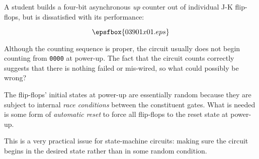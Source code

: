 

A student builds a four-bit asynchronous {\it up} counter out of individual J-K flip-flops, but is dissatisfied with its performance:

$$\epsfbox{03901x01.eps}$$

Although the counting sequence is proper, the circuit usually does not begin counting from {\tt 0000} at power-up.  The fact that the circuit counts correctly suggests that there is nothing failed or mis-wired, so what could possibly be wrong?







The flip-flops' initial states at power-up are essentially random because they are subject to internal {\it race conditions} between the constituent gates.  What is needed is some form of {\it automatic reset} to force all flip-flops to the reset state at power-up.







This is a very practical issue for state-machine circuits: making sure the circuit begins in the desired state rather than in some random condition.




